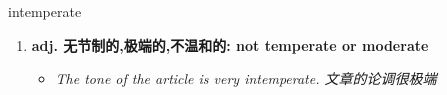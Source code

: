 
\begin{frame}
{\huge intemperate}
\begin{center}
\begin{enumerate}\Large
  \item \textbf{adj. 无节制的,极端的,不温和的: not temperate or moderate}
  \begin{itemize}
    \item \em{\Large{The tone of the article is very intemperate. 文章的论调很极端}}
  \end{itemize}
\end{enumerate}
\end{center}
\end{frame}
